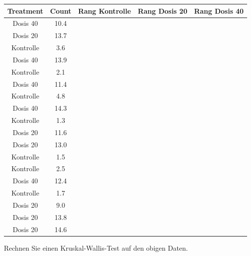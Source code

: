 \documentclass[a4paper, 9pt]{scrartcl}\usepackage[]{graphicx}\usepackage[]{xcolor}
\newenvironment{knitrout}{}{} %
\begin{document}
\begin{knitrout}
\color{fgcolor}\begin{table}[!h]
\centering
\begin{tabular}{ccccc}
\toprule
Treatment & Count & Rang Kontrolle & Rang Dosis 20 & Rang Dosis 40\\
\midrule
Dosis 40 & 10.4 &  &  & \\
Dosis 20 & 13.7 &  &  & \\
Kontrolle & 3.6 &  &  & \\
Dosis 40 & 13.9 &  &  & \\
Kontrolle & 2.1 &  &  & \\
\addlinespace
Dosis 40 & 11.4 &  &  & \\
Kontrolle & 4.8 &  &  & \\
Dosis 40 & 14.3 &  &  & \\
Kontrolle & 1.3 &  &  & \\
Dosis 20 & 11.6 &  &  & \\
\addlinespace
Dosis 20 & 13.0 &  &  & \\
Kontrolle & 1.5 &  &  & \\
Kontrolle & 2.5 &  &  & \\
Dosis 40 & 12.4 &  &  & \\
Kontrolle & 1.7 &  &  & \\
\addlinespace
Dosis 20 & 9.0 &  &  & \\
Dosis 20 & 13.8 &  &  & \\
Dosis 20 & 14.6 &  &  & \\
\bottomrule
\end{tabular}
\end{table}

\end{knitrout}

Rechnen Sie einen Kruskal-Wallis-Test auf den obigen Daten.
\end{document}
